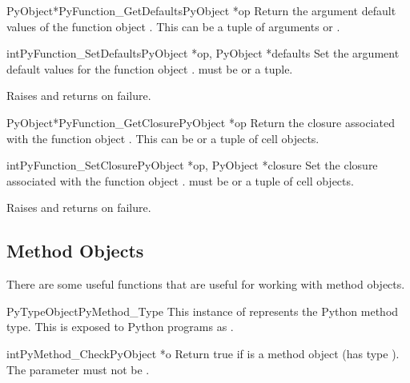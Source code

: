 \begin{cfuncdesc}{PyObject*}{PyFunction_GetDefaults}{PyObject *op}
  Return the argument default values of the function object .
  This can be a tuple of arguments or \NULL{}.
\end{cfuncdesc}

\begin{cfuncdesc}{int}{PyFunction_SetDefaults}{PyObject *op,
                                               PyObject *defaults}
  Set the argument default values for the function object .
   must be  or a tuple.

  Raises  and returns  on failure.
\end{cfuncdesc}

\begin{cfuncdesc}{PyObject*}{PyFunction_GetClosure}{PyObject *op}
  Return the closure associated with the function object .
  This can be \NULL{} or a tuple of cell objects.
\end{cfuncdesc}

\begin{cfuncdesc}{int}{PyFunction_SetClosure}{PyObject *op,
                                              PyObject *closure}
  Set the closure associated with the function object .
   must be  or a tuple of cell objects.

  Raises  and returns  on failure.
\end{cfuncdesc}


\subsection{Method Objects \label{method-objects}}

There are some useful functions that are useful for working with
method objects.

\begin{cvardesc}{PyTypeObject}{PyMethod_Type}
  This instance of  represents the Python method
  type.  This is exposed to Python programs as .
\end{cvardesc}

\begin{cfuncdesc}{int}{PyMethod_Check}{PyObject *o}
  Return true if  is a method object (has type
  ).  The parameter must not be \NULL{}.
\end{cfuncdesc}

